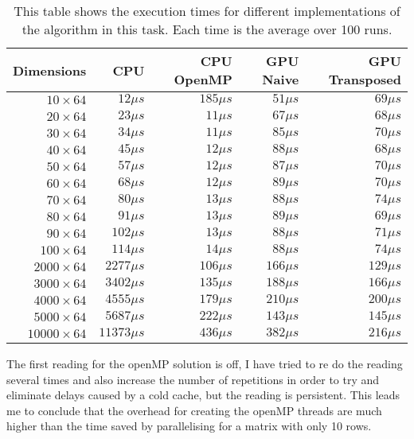 \begin{table}[H]
\centering
\begin{tabular}{|r|r|r|r|r|}
\hline
\textbf{Dimensions} & \textbf{CPU} & \textbf{CPU OpenMP} & \textbf{GPU Naive} & \textbf{GPU Transposed} \\ \hline
$10 \times 64$      & $12\mu s$    & $185\mu s$          & $51\mu s$          & $69\mu s$               \\
$20 \times 64$      & $23\mu s$    & $11\mu s$           & $67\mu s$          & $68\mu s$               \\
$30 \times 64$      & $34\mu s$    & $11\mu s$           & $85\mu s$          & $70\mu s$               \\
$40 \times 64$      & $45\mu s$    & $12\mu s$           & $88\mu s$          & $68\mu s$               \\
$50 \times 64$      & $57\mu s$    & $12\mu s$           & $87\mu s$          & $70\mu s$               \\
$60 \times 64$      & $68\mu s$    & $12\mu s$           & $89\mu s$          & $70\mu s$               \\
$70 \times 64$      & $80\mu s$    & $13\mu s$           & $88\mu s$          & $74\mu s$               \\
$80 \times 64$      & $91\mu s$    & $13\mu s$           & $89\mu s$          & $69\mu s$               \\
$90 \times 64$      & $102\mu s$   & $13\mu s$           & $88\mu s$          & $71\mu s$               \\
$100 \times 64$     & $114\mu s$   & $14\mu s$           & $88\mu s$          & $74\mu s$               \\
$2000 \times 64$    & $2277\mu s$  & $106\mu s$          & $166\mu s$         & $129\mu s$              \\
$3000 \times 64$    & $3402\mu s$  & $135\mu s$          & $188\mu s$         & $166\mu s$              \\
$4000 \times 64$    & $4555\mu s$  & $179\mu s$          & $210\mu s$         & $200\mu s$              \\
$5000 \times 64$    & $5687\mu s$  & $222\mu s$          & $143\mu s$         & $145\mu s$              \\
$10000 \times 64$   & $11373\mu s$ & $436\mu s$          & $382\mu s$         & $216\mu s$              \\ \hline
\end{tabular}
\caption{This table shows the execution times for different implementations of
    the algorithm in this task. Each time is the average over 100 runs.}
\label{tab:task2times}
\end{table}

The first reading for the openMP solution is off, I have tried to re do the
reading several times and also increase the number of repetitions in order to
try and eliminate delays caused by a cold cache, but the reading is persistent.
This leads me to conclude that the overhead for creating the openMP threads are
much higher than the time saved by parallelising for a matrix with only 10 rows.
